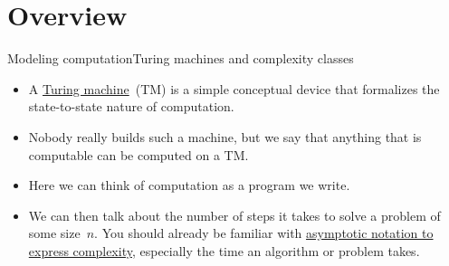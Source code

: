 
\section{Overview}

\begin{frame}{Modeling computation}{Turing machines and complexity classes}
\begin{itemize}
    \item A \href{https://en.wikipedia.org/wiki/Turing_machine}{Turing machine}~(TM) is a simple conceptual device that formalizes the state-to-state nature of computation.
    \item Nobody really builds such a machine, but we say that anything that is computable can be computed on a TM.   
    \item<3-> Here we can think of computation as a program we write. 
    \item<4-> We can then talk about the number of steps it takes to solve a problem of some size~$n$.  You should already be familiar with \href{https://en.wikipedia.org/wiki/Asymptotic_computational_complexity}{asymptotic notation to express complexity}, especially the time an algorithm or problem takes.
\end{itemize}

    
\end{frame}

